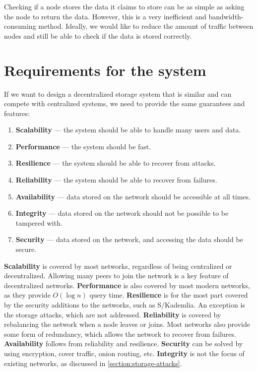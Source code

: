Checking if a node stores the data it claims to store can be as simple as asking the node to return the data.
However, this is a very inefficient and bandwidth-consuming method.
Ideally, we would like to reduce the amount of traffic between nodes and still be able to check
if the data is stored correctly.

\section{Requirements for the system}

If we want to design a decentralized storage system that is similar and can compete with centralized systems,
we need to provide the same guarantees and features:
\begin{enumerate}
    \item \textbf{Scalability} --- the system should be able to handle many users and data.
    \item \textbf{Performance} --- the system should be fast.
    \item \textbf{Resilience} --- the system should be able to recover from attacks.
    \item \textbf{Reliability} --- the system should be able to recover from failures.
    \item \textbf{Availability} --- data stored on the network should be accessible at all times.
    \item \textbf{Integrity} --- data stored on the network should not be possible to be tampered with.
    \item \textbf{Security} --- data stored on the network, and accessing the data should be secure.
\end{enumerate}

\textbf{Scalability} is covered by most networks, regardless of being centralized or decentralized.
Allowing many peers to join the network is a key feature of decentralized networks.
\textbf{Performance} is also covered by most modern networks, as they provide $O(\log n)$ query time.
\textbf{Resilience} is for the most part covered by the security additions to the networks, such as S/Kademlia.
An exception is the storage attacks, which are not addressed.
\textbf{Reliability} is covered by rebalancing the network when a node leaves or joins.
Most networks also provide some form of redundancy, which allows the network to recover from failures.
\textbf{Availability} follows from reliability and resilience.
\textbf{Security} can be solved by using encryption, cover traffic, onion routing, etc.
\textbf{Integrity} is not the focus of existing networks, as discussed in \ref{section:storage-attacks}.

